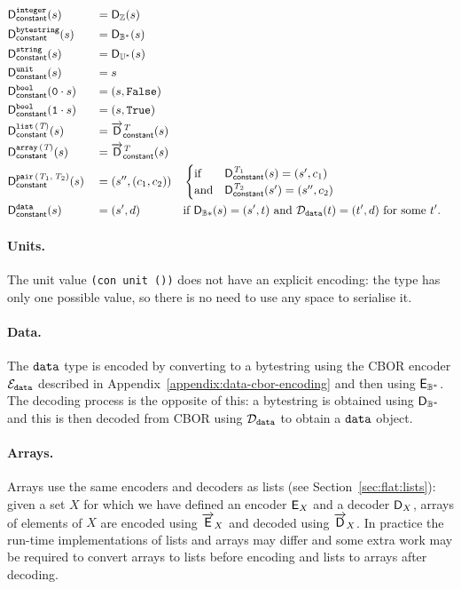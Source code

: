 \begin{alignat*}{3}
  &\mathsf{D}_{\mathsf{constant}}^{\mathtt{integer}}(s)              &&= \mathsf{D}_{\mathbb{Z}}(s) \\
  &\mathsf{D}_{\mathsf{constant}}^{\mathtt{bytestring}}(s)           &&= \mathsf{D}_{\mathbb{B}^*}(s) \\
  &\mathsf{D}_{\mathsf{constant}}^{\mathtt{string}}(s)               &&= \mathsf{D}_{\mathbb{U}^*}(s) \\
  &\mathsf{D}_{\mathsf{constant}}^{\mathtt{unit}}(s)                 &&= s  \\
  &\mathsf{D}_{\mathsf{constant}}^{\mathtt{bool}}(\mathtt{0} \cdot s)  &&= (s, \texttt{False}) \\
  &\mathsf{D}_{\mathsf{constant}}^{\mathtt{bool}}(\mathtt{1} \cdot s)  &&= (s, \texttt{True}) \\
  &\mathsf{D}_{\mathsf{constant}}^{\mathtt{list}\,\mathtt{(}\textit{T}\mathtt{)}}(s)              &&= \overrightarrow{\mathsf{D}}^{\textit{T}}_{\mathsf{constant}}(s) \\
  &\mathsf{D}_{\mathsf{constant}}^{\mathtt{array}\,\mathtt{(}\textit{T}\mathtt{)}}(s)             &&= \overrightarrow{\mathsf{D}}^{\textit{T}}_{\mathsf{constant}}(s) \\
  &\mathsf{D}_{\mathsf{constant}}^{\mathtt{pair}\,\mathtt{(}\textit{T}_1\mathtt{,}\,\textit{T}_2\mathtt{)}}(s)     &&= (s'', (c_1, c_2))
  && \begin{cases}
       \text{if}  & \mathsf{D}_{\mathsf{constant}}^{\textit{T}_1}(s) = (s', c_1) \\
       \text{and} & \mathsf{D}_{\mathsf{constant}}^{\textit{T}_2}(s') = (s'', c_2)
     \end{cases}\\
  &\mathsf{D}_{\mathsf{constant}}^{\mathtt{data}}(s)                  &&= (s', d) &&
                                           \text{if $\mathsf{D}_{\mathbb{B}*}(s) = (s', t)$
                                            and $\mathcal{D}_{\mathtt{data}}(t) = (t', d)$ for some $t'$}.
\end{alignat*}

\paragraph{Units.} The unit value \texttt{(con unit ())} does not have
an explicit encoding: the type has only one possible value, so there is no need
to use any space to serialise it.

\paragraph{Data.} The $\mathtt{data}$ type is encoded by converting to a bytestring using the CBOR
encoder $\mathcal{E}_{\mathtt{data}}$ described in Appendix~\ref{appendix:data-cbor-encoding} and
then using $\mathsf{E}_{\mathbb{B}^*}$.  The decoding process is the opposite of this: a
bytestring is obtained using $\mathsf{D}_{\mathbb{B}^*}$ and this is then decoded from CBOR
using $\mathcal{D}_{\mathtt{data}}$ to obtain a $\mathtt{data}$ object.

\paragraph{Arrays.} Arrays use the same encoders and decoders as lists (see
Section~\ref{sec:flat:lists}): given a set $X$ for which we have defined an
encoder $\mathsf{E}_X$ and a decoder $\mathsf{D}_X$, arrays of elements of $X$ are encoded using
$\overrightarrow{\mathsf{E}}_X$ and decoded using $\overrightarrow{\mathsf{D}}_X$.  In practice the run-time
implementations of lists and arrays may differ and some extra work may be
required to convert arrays to lists before encoding and lists to arrays after
decoding.


